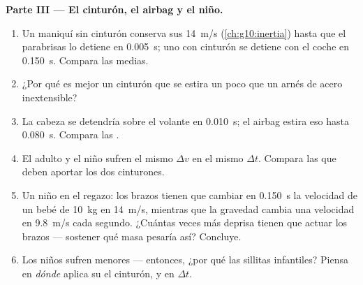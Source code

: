\begin{problem}
\medskip
\noindent\textbf{Parte III --- El cinturón, el airbag y el niño.}
\begin{enumerate}[resume]
  \item Un maniquí sin cinturón conserva sus \qty{14}{m/s}
        (\cref{ch:g10:inertia}) hasta que el parabrisas lo detiene en
        \qty{0.005}{s}; uno con cinturón se detiene con el coche en
        \qty{0.150}{s}. Compara las  medias.
  \item ¿Por qué es mejor un cinturón que se estira un poco que un arnés
        de acero inextensible?
  \item La cabeza se detendría sobre el volante en \qty{0.010}{s}; el
        airbag estira eso hasta \qty{0.080}{s}. Compara las .
  \item El adulto y el niño sufren el mismo $\Delta v$ en el mismo
        $\Delta t$. Compara las  que deben aportar los dos
        cinturones.
  \item Un niño en el regazo: los brazos tienen que cambiar en
        \qty{0.150}{s} la velocidad de un bebé de \qty{10}{kg} en
        \qty{14}{m/s}, mientras que la gravedad cambia una velocidad en
        \qty{9.8}{m/s} cada segundo. ¿Cuántas veces más deprisa tienen
        que actuar los brazos --- sostener qué masa pesaría así?
        Concluye.
  \item Los niños sufren  menores --- entonces, ¿por qué las
        sillitas infantiles? Piensa en \emph{dónde} aplica su  el
        cinturón, y en $\Delta t$.
\end{enumerate}


\end{problem}
